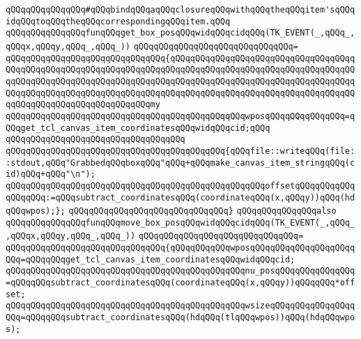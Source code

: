 \verb|qQQqqQQqqQQqqQQq#qQQqbindqQQqaqQQqclosureqQQqwithqQQqtheqQQqitem'sqQQqidqQQqtoqQQqtheqQQqcorrespondingqQQqitem.qQQq|\newline
\newline
\newline
\verb|qQQqqQQqqQQqqQQqfunqQQqget_box_posqQQqwidqQQqcidqQQq(TK_EVENT(_,qQQq_,qQQqx,qQQqy,qQQq_,qQQq_))|\newline
\verb|qQQqqQQqqQQqqQQqqQQqqQQqqQQqqQQq=|\newline
\verb|qQQqqQQqqQQqqQQqqQQqqQQqqQQqqQQq{qQQqqQQqqQQqqQQqqQQqqQQqqQQqqQQqqQQqqQQqqQQqqQQqqQQqqQQqqQQqqQQqqQQqqQQqqQQqqQQqqQQqqQQqqQQqqQQqqQQqqQQqqQQqqQQqqQQqqQQqqQQqqQQqqQQqqQQqqQQqqQQqqQQqqQQqqQQqqQQqqQQqqQQqqQQqqQQqqQQqqQQqqQQqqQQqqQQqqQQqqQQqqQQqqQQqqQQqqQQqqQQqqQQqqQQqqQQqqQQqqQQqqQQqqQQqqQQqqQQqqQQqqQQqqQQqqQQqmy|\newline
\verb|qQQqqQQqqQQqqQQqqQQqqQQqqQQqqQQqqQQqqQQqqQQqqQQqwposqQQqqQQqqQQqqQQq=qQQqget_tcl_canvas_item_coordinatesqQQqwidqQQqcid;qQQq|\newline
\verb|qQQqqQQqqQQqqQQqqQQqqQQqqQQqqQQqqQQq|\newline
\verb|qQQqqQQqqQQqqQQqqQQqqQQqqQQqqQQqqQQqqQQqqQQq{qQQqfile::writeqQQq(file::stdout,qQQq"GrabbedqQQqboxqQQq"qQQq+qQQqmake_canvas_item_stringqQQq(cid)qQQq+qQQq"\n");|\newline
\verb|qQQqqQQqqQQqqQQqqQQqqQQqqQQqqQQqqQQqqQQqqQQqqQQqqQQqoffsetqQQqqQQqqQQqqQQqqQQq:=qQQqsubtract_coordinatesqQQq(coordinateqQQq(x,qQQqy))qQQq(hdqQQqwpos);};|\newline
\verb|qQQqqQQqqQQqqQQqqQQqqQQqqQQqqQQq}|\newline
\newline
\verb|qQQqqQQqqQQqqQQqalso|\newline
\verb|qQQqqQQqqQQqqQQqfunqQQqmove_box_posqQQqwidqQQqcidqQQq(TK_EVENT(_,qQQq_,qQQqx,qQQqy,qQQq_,qQQq_))|\newline
\verb|qQQqqQQqqQQqqQQqqQQqqQQqqQQqqQQq=|\newline
\verb|qQQqqQQqqQQqqQQqqQQqqQQqqQQqqQQq{qQQqqQQqqQQqwposqQQqqQQqqQQqqQQqqQQqqQQq=qQQqqQQqget_tcl_canvas_item_coordinatesqQQqwidqQQqcid;|\newline
\verb|qQQqqQQqqQQqqQQqqQQqqQQqqQQqqQQqqQQqqQQqqQQqqQQqnu_posqQQqqQQqqQQqqQQq=qQQqqQQqsubtract_coordinatesqQQq(coordinateqQQq(x,qQQqy))qQQqqQQq*offset;|\newline
\verb|qQQqqQQqqQQqqQQqqQQqqQQqqQQqqQQqqQQqqQQqqQQqqQQqwsizeqQQqqQQqqQQqqQQqqQQq=qQQqqQQqsubtract_coordinatesqQQq(hdqQQq(tlqQQqwpos))qQQq(hdqQQqwpos);|\newline
